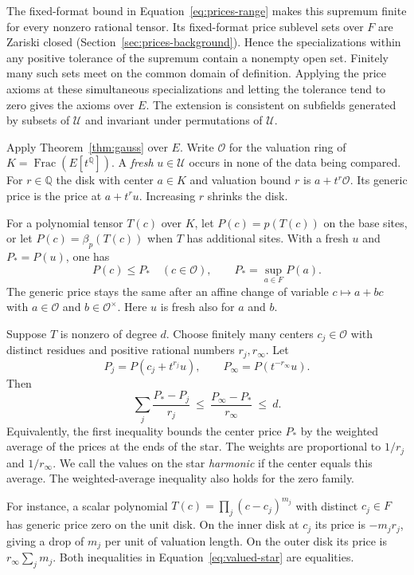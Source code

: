 The fixed-format bound in Equation~\eqref{eq:prices-range} makes this
supremum finite for every nonzero rational tensor. Its fixed-format
price sublevel sets over $F$ are Zariski closed
(Section~\ref{sec:prices-background}). Hence the specializations
within any positive tolerance of the supremum contain a nonempty
open set. Finitely many such sets meet on the common domain of
definition. Applying the price axioms at these simultaneous
specializations and letting the tolerance tend to zero gives the
axioms over $E$. The extension is consistent on subfields generated
by subsets of $\mathcal U$ and invariant under permutations of
$\mathcal U$.

Apply Theorem~\ref{thm:gauss} over $E$. Write $\mathcal O$ for the
valuation ring of $K=\operatorname{Frac}(E[t^{\mathbb Q}])$.
A \emph{fresh} $u\in\mathcal U$ occurs in none of the data being
compared. For $r\in\mathbb Q$ the disk with center $a\in K$ and
valuation bound $r$ is $a+t^r\mathcal O$. Its generic price is the
price at $a+t^r u$. Increasing $r$ shrinks the disk.

\begin{lemma}\label{lem:star}
For a polynomial tensor $T(c)$ over $K$, let $P(c)=p(T(c))$ on the
base sites, or let $P(c)=\beta_p(T(c))$ when $T$ has additional
sites. With a fresh $u$ and $P_*=P(u)$, one has
\[
 P(c)\le P_* \quad (c\in\mathcal O), \qquad P_*=\sup_{a\in F}P(a).
\]
The generic price stays the same after an affine change of variable
$c\mapsto a+bc$ with $a\in\mathcal O$ and $b\in\mathcal O^\times$.
Here $u$ is fresh also for $a$ and $b$.

Suppose $T$ is nonzero of degree $d$. Choose finitely many centers
$c_j\in\mathcal O$ with distinct residues and positive rational
numbers $r_j,r_\infty$. Let
\[
 P_j=P(c_j+t^{r_j}u),\qquad P_\infty=P(t^{-r_\infty}u).
\]
Then
\begin{equation}\label{eq:valued-star}
 \sum_j\frac{P_*-P_j}{r_j}
 \ \le\ \frac{P_\infty-P_*}{r_\infty}\ \le\ d .
\end{equation}
Equivalently, the first inequality bounds the center price $P_*$
by the weighted average of the prices at the ends of the star.
The weights are proportional to $1/r_j$ and $1/r_\infty$. We call
the values on the star \emph{harmonic} if the center equals this
average. The weighted-average inequality also holds for the zero
family.
\end{lemma}

For instance, a scalar polynomial $T(c)=\prod_j(c-c_j)^{m_j}$
with distinct $c_j\in F$ has generic price zero on the unit disk.
On the inner disk at $c_j$ its price is $-m_jr_j$, giving a drop
of $m_j$ per unit of valuation length. On the outer disk its price
is $r_\infty\sum_j m_j$. Both inequalities in
Equation~\eqref{eq:valued-star} are equalities.

